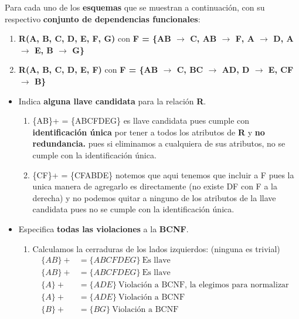 Para cada uno de los \textbf{esquemas} que se muestran a continuación, con su respectivo \textbf{conjunto de dependencias funcionales}:

\begin{enumerate}[label=\alph*.]
    \item \textbf{R(A, B, C, D, E, F, G)} con \textbf{F = \{AB $\rightarrow$ C, AB $\rightarrow$ F, A $\rightarrow$ D, A $\rightarrow$ E, B $\rightarrow$ G\}}
    \item \textbf{R(A, B, C, D, E, F)} con \textbf{F = \{AB $\rightarrow$ C, BC $\rightarrow$ AD, D $\rightarrow$ E, CF $\rightarrow$ B\}}
\end{enumerate}

\begin{itemize}
    \item Indica \textbf{alguna llave candidata} para la relación \textbf{R}. \vspace{.3cm}

    \begin{enumerate}[label=\alph*.]
        \item \{AB\}+ = \{ABCFDEG\} es llave candidata pues cumple con \textbf{identificación única} por tener a todos los atributos de \textbf{R} y \textbf{no redundancia.} pues si eliminamos a cualquiera de sus atributos, no se cumple con la identificación única.  \vspace{.2cm}
        
        \item \{CF\}+ = \{CFABDE\} notemos que aqui tenemos que incluir a F pues la unica manera de agregarlo es directamente (no existe DF con F a la derecha) y no podemos quitar a ninguno de los atributos de la llave candidata pues no se cumple con la identificación única. \vspace{.2cm}
    \end{enumerate}
    \vspace{.3cm}

    \item Especifica \textbf{todas las violaciones} a la \textbf{BCNF}. \vspace{.3cm}
    
    \begin{enumerate}[label=\alph*.]
        \item 
        Calculamos la cerraduras de los lados izquierdos: (ninguna es trivial)
        \begin{align*}
            \{AB\}+ &= \{ABCFDEG\} \ \text{Es llave} \\
            \{AB\}+ &= \{ABCFDEG\} \ \text{Es llave} \\
            \{A\}+ &= \{ADE\} \ \text{Violación a BCNF, la elegimos para normalizar } \\
            \{A\}+ &= \{ADE\} \ \text{Violación a BCNF} \\
            \{B\}+ &= \{BG\} \ \text{Violación a BCNF} 
        \end{align*}


\end{enumerate}
\end{itemize}
